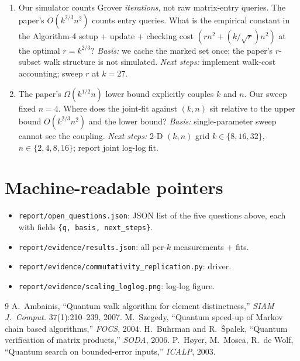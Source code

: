 \documentclass[11pt,letterpaper]{article}
\begin{document}
\begin{enumerate}
\item[Q4.] Our simulator counts Grover \emph{iterations}, not raw matrix-entry
      queries. The paper's $O(k^{2/3} n^2)$ counts entry queries. What is the
      empirical constant in the Algorithm-4 setup + update + checking cost
      $(rn^2 + (k/\sqrt{r}) n^2)$ at the optimal $r = k^{2/3}$?
      \emph{Basis:} we cache the marked set once; the paper's $r$-subset walk
      structure is not simulated.
      \emph{Next steps:} implement walk-cost accounting; sweep $r$ at $k=27$.

\item[Q5.] The paper's $\Omega(k^{1/2} n)$ lower bound explicitly couples $k$
      and $n$. Our sweep fixed $n=4$. Where does the joint-fit against
      $(k, n)$ sit relative to the upper bound $O(k^{2/3} n^2)$ and the lower
      bound?
      \emph{Basis:} single-parameter sweep cannot see the coupling.
      \emph{Next steps:} 2-D $(k, n)$ grid $k\in\{8,16,32\}$,
      $n\in\{2,4,8,16\}$; report joint log-log fit.
\end{enumerate}

\section{Machine-readable pointers}

\begin{itemize}
\item \texttt{report/open\_questions.json}: JSON list of the five questions
      above, each with fields \texttt{\{q, basis, next\_steps\}}.
\item \texttt{report/evidence/results.json}: all per-$k$ measurements + fits.
\item \texttt{report/evidence/commutativity\_replication.py}: driver.
\item \texttt{report/evidence/scaling\_loglog.png}: log-log figure.
\end{itemize}

\begin{thebibliography}{9}
 A.~Ambainis, ``Quantum walk algorithm for element
distinctness,'' \emph{SIAM J.~Comput.} 37(1):210--239, 2007.
 M.~Szegedy, ``Quantum speed-up of Markov chain based
algorithms,'' \emph{FOCS}, 2004.
 H.~Buhrman and R.~\v{S}palek, ``Quantum verification of matrix
products,'' \emph{SODA}, 2006.
 P.~H\o yer, M.~Mosca, R.~de Wolf, ``Quantum search on
bounded-error inputs,'' \emph{ICALP}, 2003.
\end{thebibliography}
\end{document}
